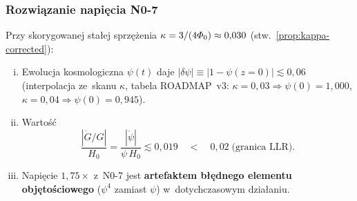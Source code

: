 \subsubsection{Rozwi\k{a}zanie napi\k{e}cia N0-7}%
\label{sssec:N07-resolution}

\begin{proposition}%
\label{prop:N07-resolved}

Przy skorygowanej sta\l{}ej sprz\k{e}\.zenia
$\kappa = 3/(4\varPhi_0) \approx 0{,}030$
(stw.~\ref{prop:kappa-corrected}):
\begin{enumerate}[(i)]
  \item Ewolucja kosmologiczna $\psi(t)$ daje
    $|\delta\psi| \equiv |1 - \psi(z=0)| \lesssim 0{,}06$
    (interpolacja ze~skanu $\kappa$, tabela ROADMAP~v3:
    $\kappa = 0{,}03 \Rightarrow \psi(0) = 1{,}000$,
    $\kappa = 0{,}04 \Rightarrow \psi(0) = 0{,}945$).
  \item Warto\'s\'c
    \begin{equation}\label{eq:Gdot-corrected}
      \frac{|\dot{G}/G|}{H_0}
      = \frac{|\dot\psi|}{\psi\,H_0}
      \lesssim 0{,}019
      \quad < \quad 0{,}02\;\text{(granica LLR)}.
    \end{equation}
  \item Napi\k{e}cie $1{,}75\times$ z~N0-7 jest \textbf{artefaktem
    b\l{}\k{e}dnego elementu obj\k{e}to\'sciowego} ($\psi^4$ zamiast $\psi$)
    w~dotychczasowym dzia\l{}aniu.
\end{enumerate}
\end{proposition}

